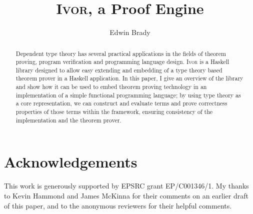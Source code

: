 \documentclass[orivec,dvips,10pt]{llncs}
\newcommand{\Ivor}{\textsc{Ivor}}
\begin{document}
\title{\Ivor{}, a Proof Engine}
\author{Edwin Brady}

 
\maketitle

\begin{abstract}
Dependent type theory has several practical applications in the fields
of theorem proving, program verification and programming language
design. \Ivor{} is a Haskell library designed to allow easy extending
and embedding of a type theory based theorem prover in a Haskell
application. In this paper, I give an overview of the library and show
how it can be used to embed theorem proving technology in an
implementation of a simple functional programming language; by using
type theory as a core representation, we can construct and evaluate
terms and prove correctness properties of those terms within the
 framework, ensuring consistency of the implementation and
the theorem prover. 

\end{abstract}





%







\section*{Acknowledgements}

This work is generously supported by EPSRC grant EP/C001346/1. 
My thanks to Kevin Hammond and James McKinna for their comments on an
earlier draft of this paper, and to the anonymous reviewers for their
helpful comments.


\begin{small}



%

\end{small}
\end{document}
